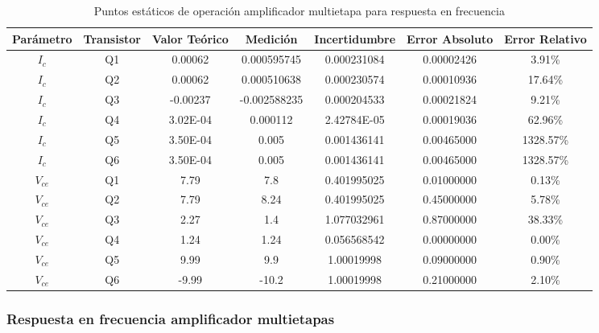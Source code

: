 \begin{table}[h!]
\centering
\begin{tabular}{|c|c|c|c|c|c|c|}
\hline
\textbf{Parámetro} & \textbf{Transistor} & \textbf{Valor Teórico} & \textbf{Medición} & \textbf{Incertidumbre} & \textbf{Error Absoluto} & \textbf{Error Relativo} \\ \hline
$I_{c}$ & Q1 & 0.00062 & 0.000595745 & 0.000231084 & 0.00002426 & 3.91\% \\ \hline
$I_{c}$ & Q2 & 0.00062 & 0.000510638 & 0.000230574 & 0.00010936 & 17.64\% \\ \hline
$I_{c}$ & Q3 & -0.00237 & -0.002588235 & 0.000204533 & 0.00021824 & 9.21\% \\ \hline
$I_{c}$ & Q4 & 3.02E-04 & 0.000112 & 2.42784E-05 & 0.00019036 & 62.96\% \\ \hline
$I_{c}$ & Q5 & 3.50E-04 & 0.005 & 0.001436141 & 0.00465000 & 1328.57\% \\ \hline
$I_{c}$ & Q6 & 3.50E-04 & 0.005 & 0.001436141 & 0.00465000 & 1328.57\% \\ \hline
$V_{ce}$ & Q1 & 7.79 & 7.8 & 0.401995025 & 0.01000000 & 0.13\% \\ \hline
$V_{ce}$ & Q2 & 7.79 & 8.24 & 0.401995025 & 0.45000000 & 5.78\% \\ \hline
$V_{ce}$ & Q3 & 2.27 & 1.4 & 1.077032961 & 0.87000000 & 38.33\% \\ \hline
$V_{ce}$ & Q4 & 1.24 & 1.24 & 0.056568542 & 0.00000000 & 0.00\% \\ \hline
$V_{ce}$ & Q5 & 9.99 & 9.9 & 1.00019998 & 0.09000000 & 0.90\% \\ \hline
$V_{ce}$ & Q6 & -9.99 & -10.2 & 1.00019998 & 0.21000000 & 2.10\% \\ \hline
\end{tabular}
\caption{Puntos estáticos de operación amplificador multietapa para respuesta en frecuencia}
\label{tab:med-puntos-estaticos-operacion-amplificador-multietapa-respuesta-frecuencia}
\end{table}


\FloatBarrier
\subsubsection{Respuesta en frecuencia amplificador multietapas}

